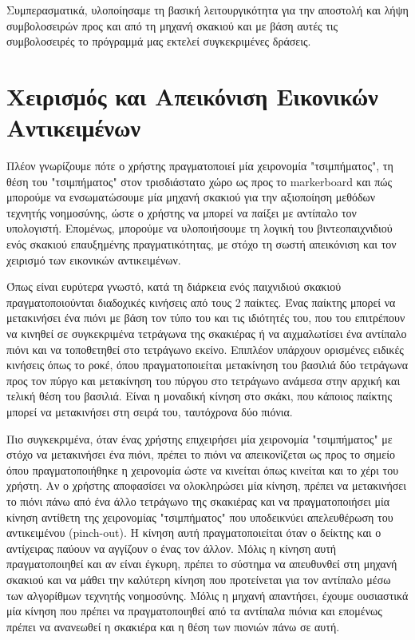 Συμπερασματικά, υλοποίησαμε τη βασική λειτουργικότητα για την αποστολή και λήψη συμβολοσειρών προς και από τη μηχανή σκακιού και με βάση αυτές τις συμβολοσειρές το πρόγραμμά μας εκτελεί συγκεκριμένες δράσεις.






\section{Χειρισμός και Απεικόνιση Εικονικών Αντικειμένων} \label{s:rendering}



Πλέον γνωρίζουμε πότε ο χρήστης πραγματοποιεί μία χειρονομία "τσιμπήματος", τη θέση του "τσιμπήματος" στον τρισδιάστατο χώρο ως προς το markerboard και πώς μπορούμε να ενσωματώσουμε μία μηχανή σκακιού για την αξιοποίηση μεθόδων τεχνητής νοημοσύνης, ώστε ο χρήστης να μπορεί να παίξει με αντίπαλο τον υπολογιστή.
Επομένως, μπορούμε να υλοποιήσουμε τη λογική του βιντεοπαιχνιδιού ενός σκακιού επαυξημένης πραγματικότητας, με στόχο τη σωστή απεικόνιση και τον χειρισμό των εικονικών αντικειμένων.


Όπως είναι ευρύτερα γνωστό, κατά τη διάρκεια ενός παιχνιδιού σκακιού πραγματοποιούνται διαδοχικές κινήσεις από τους 2 παίκτες. Ένας παίκτης μπορεί να μετακινήσει ένα πιόνι με βάση τον τύπο του και τις ιδιότητές του, που του επιτρέπουν να κινηθεί σε συγκεκριμένα τετράγωνα της σκακιέρας ή να αιχμαλωτίσει ένα αντίπαλο πιόνι και να τοποθετηθεί στο τετράγωνο εκείνο. Επιπλέον υπάρχουν ορισμένες ειδικές κινήσεις όπως το ροκέ, όπου πραγματοποιείται μετακίνηση του βασιλιά δύο τετράγωνα προς τον πύργο και μετακίνηση του πύργου στο τετράγωνο ανάμεσα στην αρχική και τελική θέση του βασιλιά. Είναι η μοναδική κίνηση στο σκάκι, που κάποιος παίκτης μπορεί να μετακινήσει στη σειρά του, ταυτόχρονα δύο πιόνια.

Πιο συγκεκριμένα, όταν ένας χρήστης επιχειρήσει μία χειρονομία "τσιμπήματος" με στόχο να μετακινήσει ένα πιόνι, πρέπει το πιόνι να απεικονίζεται ως προς το σημείο όπου πραγματοποιήθηκε η χειρονομία ώστε να κινείται όπως κινείται και το χέρι του χρήστη.
Αν ο χρήστης αποφασίσει να ολοκληρώσει μία κίνηση, πρέπει να μετακινήσει το πιόνι πάνω από ένα άλλο τετράγωνο της σκακιέρας και να πραγματοποιήσει μία κίνηση αντίθετη της χειρονομίας "τσιμπήματος" που υποδεικνύει απελευθέρωση του αντικειμένου (pinch-out). Η κίνηση αυτή πραγματοποιείται όταν ο δείκτης και ο αντίχειρας παύουν να αγγίζουν ο ένας τον άλλον.  
Μόλις η κίνηση αυτή πραγματοποιηθεί και αν είναι έγκυρη, πρέπει το σύστημα να απευθυνθεί στη μηχανή σκακιού και να μάθει την καλύτερη κίνηση που προτείνεται για τον αντίπαλο μέσω των αλγορίθμων τεχνητής νοημοσύνης. 
Μόλις η μηχανή απαντήσει, έχουμε ουσιαστικά μία κίνηση που πρέπει να πραγματοποιηθεί από τα αντίπαλα πιόνια και επομένως πρέπει να ανανεωθεί η σκακιέρα και η θέση των πιονιών πάνω σε αυτή. 

